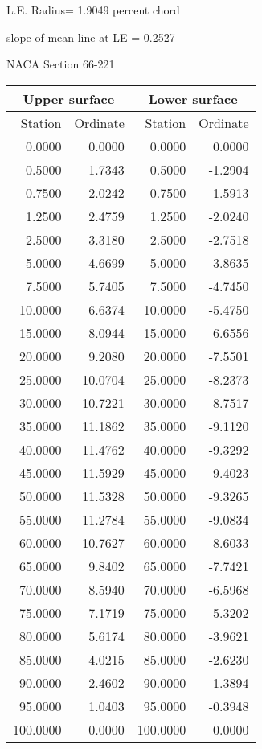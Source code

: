 \documentclass[11pt]{book}
\begin{document}
L.E. Radius=  1.9049 percent chord


 slope of mean line at LE =  0.2527
 \newpage
  \label{s66-221}
 \begin{Large}
 NACA Section 66-221
 \end{Large}
  
 \vspace{8mm}
 \begin{tabular}{|r|r|r|r|} \hline 
 \multicolumn{2}{|c|}{Upper surface} & \multicolumn{2}{|c|}{Lower surface} \\
 \hline
 Station & Ordinate & Station & Ordinate \\
 \hline
0.0000 & 0.0000 & 0.0000 & 0.0000 \\
0.5000 & 1.7343 & 0.5000 & -1.2904 \\
0.7500 & 2.0242 & 0.7500 & -1.5913 \\
1.2500 & 2.4759 & 1.2500 & -2.0240 \\
2.5000 & 3.3180 & 2.5000 & -2.7518 \\
5.0000 & 4.6699 & 5.0000 & -3.8635 \\
7.5000 & 5.7405 & 7.5000 & -4.7450 \\
10.0000 & 6.6374 & 10.0000 & -5.4750 \\
15.0000 & 8.0944 & 15.0000 & -6.6556 \\
20.0000 & 9.2080 & 20.0000 & -7.5501 \\
25.0000 & 10.0704 & 25.0000 & -8.2373 \\
30.0000 & 10.7221 & 30.0000 & -8.7517 \\
35.0000 & 11.1862 & 35.0000 & -9.1120 \\
40.0000 & 11.4762 & 40.0000 & -9.3292 \\
45.0000 & 11.5929 & 45.0000 & -9.4023 \\
50.0000 & 11.5328 & 50.0000 & -9.3265 \\
55.0000 & 11.2784 & 55.0000 & -9.0834 \\
60.0000 & 10.7627 & 60.0000 & -8.6033 \\
65.0000 & 9.8402 & 65.0000 & -7.7421 \\
70.0000 & 8.5940 & 70.0000 & -6.5968 \\
75.0000 & 7.1719 & 75.0000 & -5.3202 \\
80.0000 & 5.6174 & 80.0000 & -3.9621 \\
85.0000 & 4.0215 & 85.0000 & -2.6230 \\
90.0000 & 2.4602 & 90.0000 & -1.3894 \\
95.0000 & 1.0403 & 95.0000 & -0.3948 \\
100.0000 & 0.0000 & 100.0000 & 0.0000 \\
 \hline 
 \end{tabular}
\end{document}
